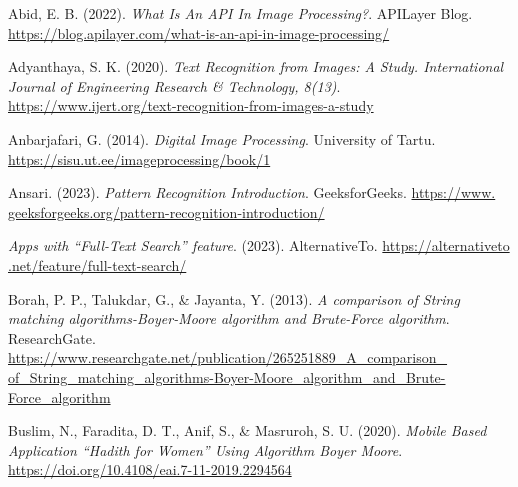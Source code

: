 {}

\begin{thebibliography}{30}

    Abid, E. B. (2022). \emph{What Is An API In Image Processing?}. APILayer Blog.
    \href{https://blog.apilayer.com/what-is-an-api-in-image-processing/}{https://blog.apilayer.com/what-is-an-api-in-image-processing/}

    Adyanthaya, S. K. (2020). \emph{Text Recognition from Images: A Study. International Journal of 
    Engineering Research \& Technology, 8(13)}.
    \href{https://www.ijert.org/text-recognition-from-images-a-study}{https://www.ijert.org/text-recognition-from-images-a-study}

    Anbarjafari, G. (2014). \emph{Digital Image Processing}. University of Tartu.
    \href{https://sisu.ut.ee/imageprocessing/book/1}{https://sisu.ut.ee/imageprocessing/book/1}

    Ansari. (2023). \emph{Pattern Recognition \textbar{} Introduction}. GeeksforGeeks.
    \href{https://www.geeksforgeeks.org/pattern-recognition-introduction/}{https://www.\\geeksforgeeks.org/pattern-recognition-introduction/}

    \emph{Apps with “Full-Text Search” feature}. (2023). AlternativeTo.
    \href{https://alternativeto.net/feature/full-text-search/}{https://alternativeto\\.net/feature/full-text-search/}

    Borah, P. P., Talukdar, G., \& Jayanta, Y. (2013). \emph{A comparison of String matching
    algorithms-Boyer-Moore algorithm and Brute-Force algorithm}. ResearchGate.
    \href{https://www.researchgate.net/publication/265251889_A_comparison_of_String_matching_algorithms-Boyer-Moore_algorithm_and_Brute-Force_algorithm}{https://www.researchgate.net/publication/265251889\_A\_comparison\_\\of\_String\_matching\_algorithms-Boyer-Moore\_algorithm\_and\_Brute-Force\_algorithm}

    Buslim, N., Faradita, D. T., Anif, S., \& Masruroh, S. U. (2020). \emph{Mobile Based Application
    “Hadith for Women” Using Algorithm Boyer Moore}.
    \href{https://doi.org/10.4108/eai.7-11-2019.2294564}{https://doi.org/10.4108/eai.7-11-2019.2294564}


\end{thebibliography}
